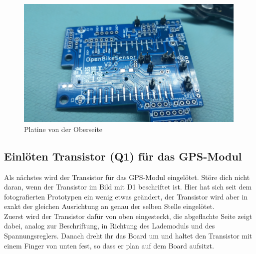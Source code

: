 \documentclass[12pt, a4paper]{article}		%
\begin{document}
\begin{figure}[H]
	\centering
		\includegraphics[width=0.99\textwidth]{Grafiken/20200726_123700.jpg}
	\caption{Platine von der Oberseite}
	\label{fig:20200726_123700}
\end{figure}

\subsection{Einlöten Transistor (Q1) für das GPS-Modul}

Als nächstes wird der Transistor für das GPS-Modul eingelötet. Störe dich nicht daran, wenn der Transistor im Bild mit D1 beschriftet ist. Hier hat sich seit dem fotografierten Prototypen ein wenig etwas geändert, der Transistor wird aber in exakt der gleichen Ausrichtung an genau der selben Stelle eingelötet. \\

Zuerst wird der Transistor dafür von oben eingesteckt, die abgeflachte Seite zeigt dabei, analog zur Beschriftung, in Richtung des Lademoduls und des Spannungsreglers. Danach dreht ihr das Board um und haltet den Transistor mit einem Finger von unten fest, so dass er plan auf dem Board aufsitzt.\\
\end{document}
